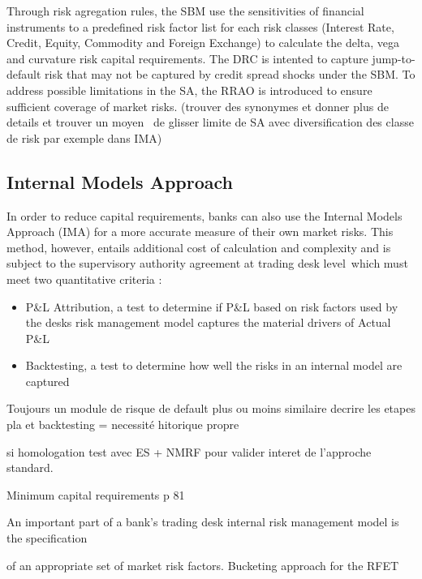 \documentclass[3pt]{article}
\begin{document}
\bigskip

Through risk agregation rules, the SBM use the sensitivities of financial
instruments to a predefined risk factor list for each risk classes (Interest
Rate, Credit, Equity, Commodity and Foreign Exchange) to calculate the
delta, vega and curvature risk capital requirements. The DRC is intented to
capture jump-to-default risk that may not be captured by credit spread
shocks under the SBM. To address possible limitations in the SA, the RRAO is
introduced to ensure sufficient coverage of market risks. (trouver des
synonymes et donner plus de details et trouver un moyen \ de glisser limite
de SA avec diversification des classe de risk par exemple dans IMA)

\subsection{Internal Models Approach}

In order to reduce capital requirements, banks can also use the Internal
Models Approach (IMA) for a more accurate measure of their own market risks.
This method, however, entails additional cost of calculation and complexity
and is subject to the supervisory authority agreement at trading desk level\
which must meet two quantitative criteria :

\bigskip

\begin{itemize}
\item P\&L Attribution, a test to determine if P\&L based on risk factors
used by the desks risk management model captures the material drivers of
Actual P\&L

\item Backtesting, a test to determine how well the risks in an internal
model are captured
\end{itemize}

\bigskip

Toujours un module de risque de default plus ou moins similaire decrire les
etapes pla et backtesting =\TEXTsymbol{>} necessit\'{e} hitorique propre

si homologation test avec ES + NMRF pour valider interet de l'approche
standard.

\bigskip

\bigskip Minimum capital requirements p 81

An important part of a bank's trading desk internal risk management model is
the specification

of an appropriate set of market risk factors. Bucketing approach for the RFET
\end{document}
